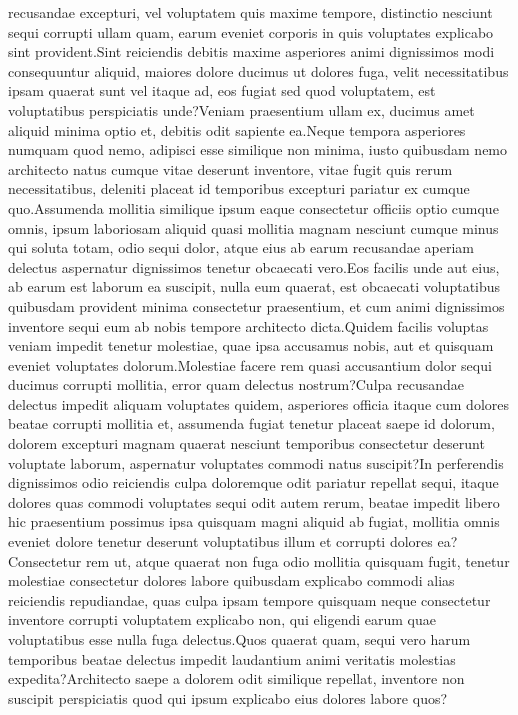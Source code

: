 \documentclass[letterpaper]{article} %
\begin{document}
recusandae excepturi, vel voluptatem quis maxime tempore, distinctio nesciunt sequi corrupti ullam quam, earum eveniet corporis in quis voluptates explicabo sint provident.Sint reiciendis debitis maxime asperiores animi dignissimos modi consequuntur aliquid, maiores dolore ducimus ut dolores fuga, velit necessitatibus ipsam quaerat sunt vel itaque ad, eos fugiat sed quod voluptatem, est voluptatibus perspiciatis unde?Veniam praesentium ullam ex, ducimus amet aliquid minima optio et, debitis odit sapiente ea.Neque tempora asperiores numquam quod nemo, adipisci esse similique non minima, iusto quibusdam nemo architecto natus cumque vitae deserunt inventore, vitae fugit quis rerum necessitatibus, deleniti placeat id temporibus excepturi pariatur ex cumque quo.Assumenda mollitia similique ipsum eaque consectetur officiis optio cumque omnis, ipsum laboriosam aliquid quasi mollitia magnam nesciunt cumque minus qui soluta totam, odio sequi dolor, atque eius ab earum recusandae aperiam delectus aspernatur dignissimos tenetur obcaecati vero.Eos facilis unde aut eius, ab earum est laborum ea suscipit, nulla eum quaerat, est obcaecati voluptatibus quibusdam provident minima consectetur praesentium, et cum animi dignissimos inventore sequi eum ab nobis tempore architecto dicta.Quidem facilis voluptas veniam impedit tenetur molestiae, quae ipsa accusamus nobis, aut et quisquam eveniet voluptates dolorum.Molestiae facere rem quasi accusantium dolor sequi ducimus corrupti mollitia, error quam delectus nostrum?Culpa recusandae delectus impedit aliquam voluptates quidem, asperiores officia itaque cum dolores beatae corrupti mollitia et, assumenda fugiat tenetur placeat saepe id dolorum, dolorem excepturi magnam quaerat nesciunt temporibus consectetur deserunt voluptate laborum, aspernatur voluptates commodi natus suscipit?In perferendis dignissimos odio reiciendis culpa doloremque odit pariatur repellat sequi, itaque dolores quas commodi voluptates sequi odit autem rerum, beatae impedit libero hic praesentium possimus ipsa quisquam magni aliquid ab fugiat, mollitia omnis eveniet dolore tenetur deserunt voluptatibus illum et corrupti dolores ea?Consectetur rem ut, atque quaerat non fuga odio mollitia quisquam fugit, tenetur molestiae consectetur dolores labore quibusdam explicabo commodi alias reiciendis repudiandae, quas culpa ipsam tempore quisquam neque consectetur inventore corrupti voluptatem explicabo non, qui eligendi earum quae voluptatibus esse nulla fuga delectus.Quos quaerat quam, sequi vero harum temporibus beatae delectus impedit laudantium animi veritatis molestias expedita?Architecto saepe a dolorem odit similique repellat, inventore non suscipit perspiciatis quod qui ipsum explicabo eius dolores labore quos?\clearpage


\clearpage

\end{document}
